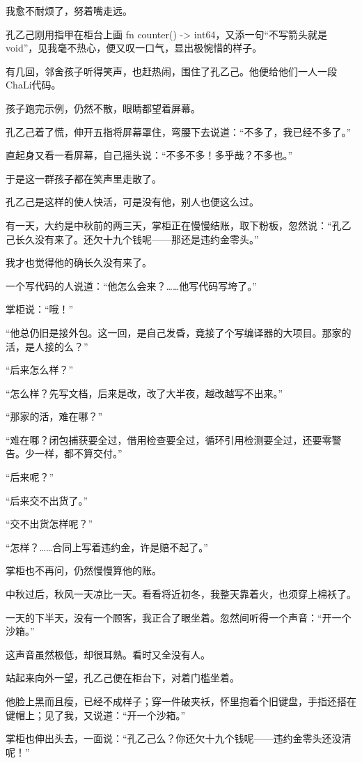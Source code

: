 我愈不耐烦了，努着嘴走远。

孔乙己刚用指甲在柜台上画 fn counter() -> int64，又添一句“不写箭头就是 void”，见我毫不热心，便又叹一口气，显出极惋惜的样子。

有几回，邻舍孩子听得笑声，也赶热闹，围住了孔乙己。他便给他们一人一段ChaLi代码。

孩子跑完示例，仍然不散，眼睛都望着屏幕。

孔乙己着了慌，伸开五指将屏幕罩住，弯腰下去说道：“不多了，我已经不多了。”

直起身又看一看屏幕，自己摇头说：“不多不多！多乎哉？不多也。”

于是这一群孩子都在笑声里走散了。

孔乙己是这样的使人快活，可是没有他，别人也便这么过。

有一天，大约是中秋前的两三天，掌柜正在慢慢结账，取下粉板，忽然说：“孔乙己长久没有来了。还欠十九个钱呢——那还是违约金零头。”

我才也觉得他的确长久没有来了。

一个写代码的人说道：“他怎么会来？……他写代码写垮了。”

掌柜说：“哦！”

“他总仍旧是接外包。这一回，是自己发昏，竟接了个写编译器的大项目。那家的活，是人接的么？”

“后来怎么样？”

“怎么样？先写文档，后来是改，改了大半夜，越改越写不出来。”

“那家的活，难在哪？”

“难在哪？闭包捕获要全过，借用检查要全过，循环引用检测要全过，还要零警告。少一样，都不算交付。”

“后来呢？”

“后来交不出货了。”

“交不出货怎样呢？”

“怎样？……合同上写着违约金，许是赔不起了。”

掌柜也不再问，仍然慢慢算他的账。

中秋过后，秋风一天凉比一天。看看将近初冬，我整天靠着火，也须穿上棉袄了。

一天的下半天，没有一个顾客，我正合了眼坐着。忽然间听得一个声音：“开一个沙箱。”

这声音虽然极低，却很耳熟。看时又全没有人。

站起来向外一望，孔乙己便在柜台下，对着门槛坐着。

他脸上黑而且瘦，已经不成样子；穿一件破夹袄，怀里抱着个旧键盘，手指还搭在键帽上；见了我，又说道：“开一个沙箱。”

掌柜也伸出头去，一面说：“孔乙己么？你还欠十九个钱呢——违约金零头还没清呢！”

